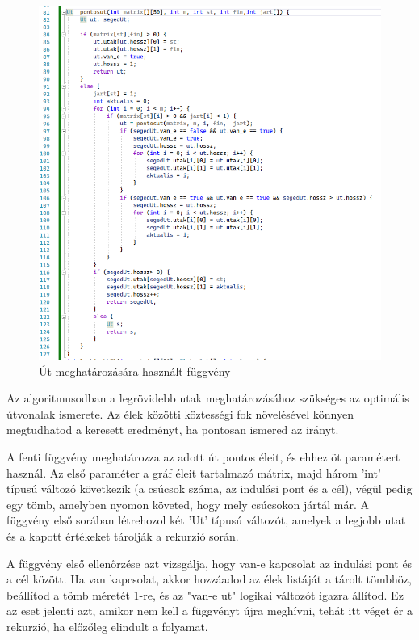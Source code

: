 \begin{figure}[h]
    \centering
    \includegraphics[scale=0.8]{images/pontosUt}
    \caption{Út meghatározására használt függvény}
    \label{fig:enter-label}
\end{figure}

Az algoritmusodban a legrövidebb utak meghatározásához szükséges az optimális útvonalak ismerete. Az élek közötti köztességi fok növelésével könnyen megtudhatod a keresett eredményt, ha pontosan ismered az irányt.

A fenti függvény meghatározza az adott út pontos éleit, és ehhez öt paramétert használ. Az első paraméter a gráf éleit tartalmazó mátrix, majd három 'int' típusú változó következik (a csúcsok száma, az indulási pont és a cél), végül pedig egy tömb, amelyben nyomon követed, hogy mely csúcsokon jártál már. A függvény első sorában létrehozol két 'Ut' típusú változót, amelyek a legjobb utat és a kapott értékeket tárolják a rekurzió során.

A függvény első ellenőrzése azt vizsgálja, hogy van-e kapcsolat az indulási pont és a cél között. Ha van kapcsolat, akkor hozzáadod az élek listáját a tárolt tömbhöz, beállítod a tömb méretét 1-re, és az "van-e ut" logikai változót igazra állítod. Ez az eset jelenti azt, amikor nem kell a függvényt újra meghívni, tehát itt véget ér a rekurzió, ha előzőleg elindult a folyamat.

